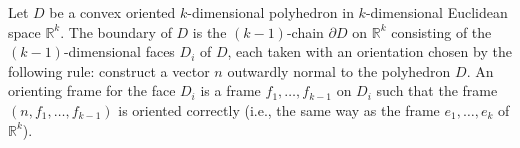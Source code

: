 Let $D$ be a convex oriented $k$-dimensional polyhedron in $k$-dimensional Euclidean space $\mathbb{R}^k$. The boundary of $D$ is the $(k-1)$-chain $\partial D$ on $\mathbb{R}^k$ consisting of the $(k-1)$-dimensional faces $D_i$ of $D$, each taken with an orientation chosen by the following rule: construct a vector $n$ outwardly normal to the polyhedron $D$. An orienting frame for the face $D_i$ is a frame $f_1, \ldots, f_{k-1}$ on $D_i$ such that the frame $(n, f_1, \ldots, f_{k-1})$ is oriented correctly (i.e., the same way as the frame $e_1, \ldots, e_k$ of $\mathbb{R}^k$).
